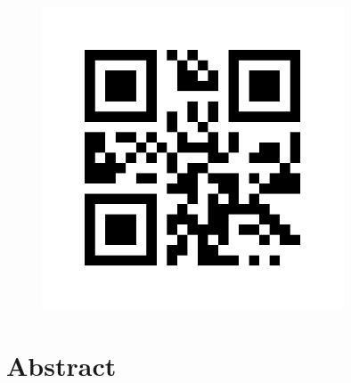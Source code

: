 \documentclass{report} %
\begin{document}
\begin{figure}[h]
    \includegraphics[width=0.8\textwidth]{./ReportImages/qrcode.png} %
    \label{fig:your-image}
\end{figure}

\newpage %

\chapter*{Abstract}
\end{document}
